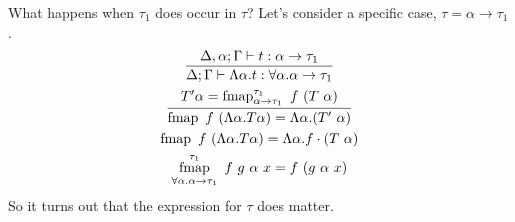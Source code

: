 \documentclass[proof]{article}
\newcommand{\entail}{\vdash}
\newcommand{\fmap}{\mathop{\mathrm{fmap}}}
\begin{document}
What happens when $\tau_1$ does occur in $\tau$? Let's consider a specific case, $\tau = \alpha\rightarrow\tau_1$.
\begin{subequations}
\begin{gather}
\infer{\Delta;\Gamma\entail\Lambda\alpha.t:\forall\alpha.\alpha\rightarrow\tau_1}{
  \Delta,\alpha;\Gamma\entail t : \alpha\rightarrow\tau_1
}\\
\infer{\fmap~f~(\Lambda\alpha.T \alpha) = \Lambda\alpha.(T'~\alpha)}{
  T' \alpha = \fmap^{\tau_1}_{\alpha\rightarrow\tau_1}~f~(T~\alpha)
}\\
\fmap~f~(\Lambda\alpha.T \alpha) = \Lambda\alpha.f \cdot (T~\alpha)
\\
\fmap^{\tau_1}_{\forall\alpha.\alpha\rightarrow\tau_1}~f~g~\alpha~x = f~(g~\alpha~x)
\end{gather}
\end{subequations}
So it turns out that the expression for $\tau$ does matter.
\end{document}
